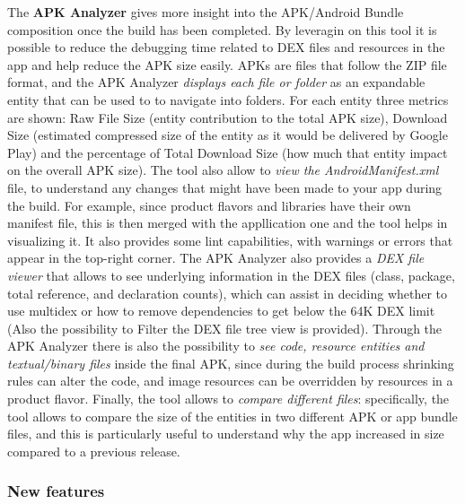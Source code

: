 \noindent The \textbf{APK Analyzer} gives more insight into the APK/Android Bundle composition once the build has been completed. By leveragin on this tool it is possible to reduce the debugging time related to DEX files and resources in the app and help reduce the APK size easily. APKs are files that follow the ZIP file format, and the APK Analyzer \textit{displays each file or folder} as an expandable entity that can be used to to navigate into folders. For each entity three metrics are shown: Raw File Size (entity contribution to the total APK size), Download Size (estimated compressed size of the entity as it would be delivered by Google Play) and the percentage of Total Download Size (how much that entity impact on the overall APK size). The tool also allow to \textit{view the AndroidManifest.xml} file, to understand any changes that might have been made to your app during the build. For example, since product flavors and libraries have their own manifest file, this is then merged with the appllication one and the tool helps in visualizing it. It also provides some lint capabilities, with warnings or errors that appear in the top-right corner. The APK Analyzer also provides a \textit{DEX file viewer} that allows to see underlying information in the DEX files (class, package, total reference, and declaration counts), which can assist in deciding whether to use multidex or how to remove dependencies to get below the 64K DEX limit (Also the possibility to Filter the DEX file tree view is provided). Through the APK Analyzer there is also the possibility to \textit{see code, resource entities and textual/binary files} inside the final APK, since during the build process shrinking rules can alter the code, and image resources can be overridden by resources in a product flavor. Finally, the tool allows to \textit{compare different files}: specifically, the tool allows to compare the size of the entities in two different APK or app bundle files, and this is particularly useful to understand why the app increased in size compared to a previous release\cite{AndroidStudioAPKAnalyzerFeature}.

\subsubsection{New features}

